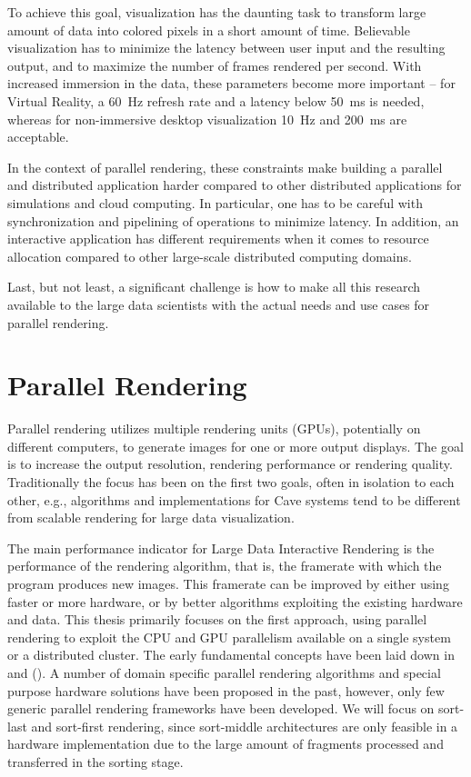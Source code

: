 To achieve this goal, visualization has the daunting task to transform large
amount of data into colored pixels in a short amount of time. Believable
visualization has to minimize the latency between user input and the resulting
output, and to maximize the number of frames rendered per second. With
increased immersion in the data, these parameters become more important --
for Virtual Reality, a 60~Hz refresh rate and a latency below 50~ms is needed,
whereas for non-immersive desktop visualization 10~Hz and 200~ms are acceptable.

In the context of parallel rendering, these constraints make building a
parallel and distributed application harder compared to other distributed
applications for simulations and cloud computing. In particular, one has to be
careful with synchronization and pipelining of operations to minimize latency.
In addition, an interactive application has different requirements when it
comes to resource allocation compared to other large-scale distributed
computing domains.

Last, but not least, a significant challenge is how to make all this research
available to the large data scientists with the actual needs and use cases for
parallel rendering.


\section{Parallel Rendering}

Parallel rendering utilizes multiple rendering units (GPUs), potentially on
different computers, to generate images for one or more output displays. The
goal is to increase the output resolution, rendering performance or rendering
quality. Traditionally the focus has been on the first two goals, often in
isolation to each other, e.g., algorithms and implementations for Cave systems
tend to be different from scalable rendering for large data visualization.

The main performance indicator for Large Data Interactive Rendering is the
performance of the rendering algorithm, that is, the framerate with which the
program produces new images. This framerate can be improved by either using
faster or more hardware, or by better algorithms exploiting the existing
hardware and data. This thesis primarily focuses on the first approach, using
parallel rendering to exploit the CPU and GPU parallelism available on a single
system or a distributed cluster. The early fundamental concepts have been laid
down in \cite{MCEF:94} and \cite{Crockett:97} (). A number of
domain specific parallel rendering algorithms and special purpose hardware
solutions have been proposed in the past, however, only few generic parallel
rendering frameworks have been developed. We will focus on sort-last and
sort-first rendering, since sort-middle architectures are only feasible in a
hardware implementation due to the large amount of fragments processed and
transferred in the sorting stage.

